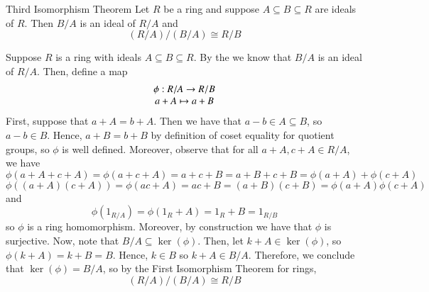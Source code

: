 \documentclass[12pt, a4paper, twoside, openright, titlepage]{book}
\begin{document}
\begin{namthm}{Third Isomorphism Theorem}{}
    Let $R$ be a ring and suppose $A \subseteq B \subseteq R$ are ideals of $R$. Then $B/A$ is an ideal of $R/A$ and \begin{equation}
        (R/A)/(B/A) \cong R/B
    \end{equation}
    \begin{center}
        \end{center}
\end{namthm}
\begin{proof*}{}{}
    Suppose $R$ is a ring with ideals $A \subseteq B \subseteq R$. By the  we know that $B/A$ is an ideal of $R/A$. Then, define a map $$\begin{array}{c} \phi: R/A\rightarrow R/B \\ a+A \mapsto a+ B \end{array}$$
    First, suppose that $a+A = b+A$. Then we have that $a-b \in A \subseteq B$, so $a - b \in B$. Hence, $a + B = b + B$ by definition of coset equality for quotient groups, so $\phi$ is well defined. Moreover, observe that for all $a+A,c+A \in R/A$, we have $$\phi(a+A+c+A) = \phi(a+c+A) = a+c+B = a+B+c+B = \phi(a+A)+\phi(c+A)$$
    $$\phi((a+A)(c+A)) = \phi(ac+A) = ac+B = (a+B)(c+B) = \phi(a+A)\phi(c+A)$$
    and $$\phi(1_{R/A})=\phi(1_R+A) = 1_R + B = 1_{R/B}$$
    so $\phi$ is a ring homomorphism. Moreover, by construction we have that $\phi$ is surjective. Now, note that $B/A \subseteq \ker(\phi)$. Then, let $k+A \in \ker(\phi)$, so $\phi(k+A) = k+B = B$. Hence, $k \in B$ so $k+A \in B/A$. Therefore, we conclude that $\ker(\phi) = B/A$, so by the First Isomorphism Theorem for rings, \begin{equation}
        (R/A)/(B/A) \cong R/B
    \end{equation}
\end{proof*}
\end{document}
